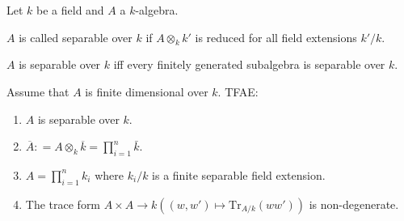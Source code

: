 \documentclass[oneside, 12pt]{scrbook}
\theoremstyle{theorem}
\begin{document}
Let $k$ be a field and $A$ a $k$-algebra.

\begin{definition}
$A$ is called separable over $k$ if $A \otimes_{k} k'$ is reduced for all field extensions $k' /k$.
\end{definition}

\begin{lemma}
$A$ is separable over $k$ iff every finitely generated subalgebra is separable over $k$.
\end{lemma}

\begin{proposition}
Assume that $A$ is finite dimensional over $k$. TFAE:
\begin{enumerate}
\item $A$ is separable over $k$.
\item $\overline{A}: = A \otimes_{k} \overline{k} = \prod_{i=1}^n \bar{k}$.
\item $A = \prod_{i=1}^n k_{i}$ where $k_{i}/k$ is a finite separable field extension.
\item The trace form $A \times A \rightarrow k ((w,w') \mapsto \mathrm{Tr}_{A/k}(ww'))$ is non-degenerate.
\end{enumerate}
\end{proposition}
\end{document}
